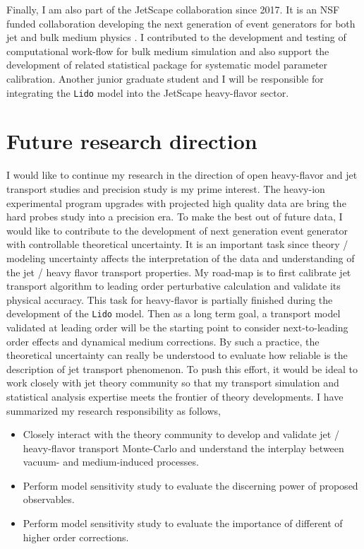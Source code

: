 \documentclass[12pt,a4paper]{article}
\begin{document}
Finally, I am also part of the JetScape collaboration since 2017. 
It is an NSF funded collaboration developing the next generation of event generators for both jet and bulk medium physics \cite{JetScape}. 
I contributed to the development and testing of computational work-flow for bulk medium simulation and also support the development of related statistical package for systematic model parameter calibration.
Another junior graduate student and I will be responsible for integrating the {\tt Lido} model into the JetScape heavy-flavor sector.

\section{Future research direction}
I would like to continue my research in the direction of open heavy-flavor and jet transport studies and precision study is my prime interest. 
The heavy-ion experimental program upgrades with projected high quality data are bring the hard probes study into a precision era. 
To make the best out of future data, I would like to contribute to the development of next generation event generator with controllable theoretical uncertainty.
It is an important task since theory / modeling uncertainty affects the interpretation of the data and understanding of the jet / heavy flavor transport properties.
My road-map is to first calibrate jet transport algorithm to leading order perturbative calculation and validate its physical accuracy. 
This task for heavy-flavor is partially finished during the development of the {\tt Lido} model.
Then as a long term goal, a transport model validated at leading order will be the starting point to consider next-to-leading order effects and dynamical medium corrections.
By such a practice, the theoretical uncertainty can really be understood to evaluate how reliable is the description of jet transport phenomenon.
To push this effort, it would be ideal to work closely with jet theory community so that my transport simulation and statistical analysis expertise meets the frontier of theory developments. 
I have summarized my research responsibility as follows,
\begin{itemize}
\item Closely interact with the theory community to develop and validate jet / heavy-flavor transport Monte-Carlo and understand the interplay between vacuum- and medium-induced processes.
\item Perform model sensitivity study to evaluate the discerning power of proposed observables.
\item Perform model sensitivity study to evaluate the importance of different of higher order corrections.
\end{itemize} 
\end{document}
